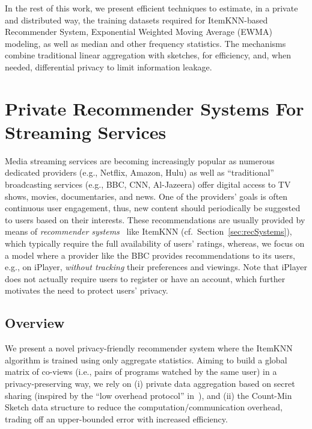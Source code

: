 \documentclass[conference]{IEEEtran}
\begin{document}
\vspace{3mm}

In the rest of this work, we present efficient techniques to estimate, in a private and distributed way, the training datasets required for ItemKNN-based Recommender System, Exponential Weighted Moving Average (EWMA) modeling, as well as median and other frequency statistics. The mechanisms combine traditional linear aggregation with sketches, for efficiency, and, when needed, differential privacy to limit information leakage.

\section{Private Recommender Systems For\\ Streaming Services}
\label{sec:service}
Media streaming services are becoming increasingly popular as numerous dedicated providers (e.g., Netflix, Amazon, Hulu) as well as ``traditional'' broadcasting services (e.g., BBC, CNN, Al-Jazeera) offer digital access to TV shows, movies, documentaries, and news.
One of the providers' goals is often continuous user engagement, thus, new content should periodically be suggested to users based on their interests. 
These recommendations are usually provided by means of {\em recommender systems}~\cite{herlocker2004evaluating, adomavicius2005toward} like ItemKNN (cf.~Section~\ref{sec:recSystems}), which typically require the full availability of users' ratings, whereas, we focus on a model where a provider like the BBC provides recommendations to its users, e.g., on iPlayer, {\em without tracking} their preferences and viewings. Note that iPlayer does not actually require users to register or have an account, which further motivates the need to protect users' privacy.





\subsection{Overview}
\label{subsec:secret}
We present a novel privacy-friendly recommender system where the ItemKNN algorithm is trained using only aggregate statistics. Aiming to build a global matrix of co-views (i.e., pairs of programs watched by the same user) in a privacy-preserving way, we rely on (i) private data aggregation based on secret sharing (inspired by the ``low overhead protocol'' in~\cite{Kursawe:2011}), and (ii) the Count-Min Sketch data structure to reduce the computation/communication overhead, trading off an upper-bounded error with increased efficiency.
\end{document}
